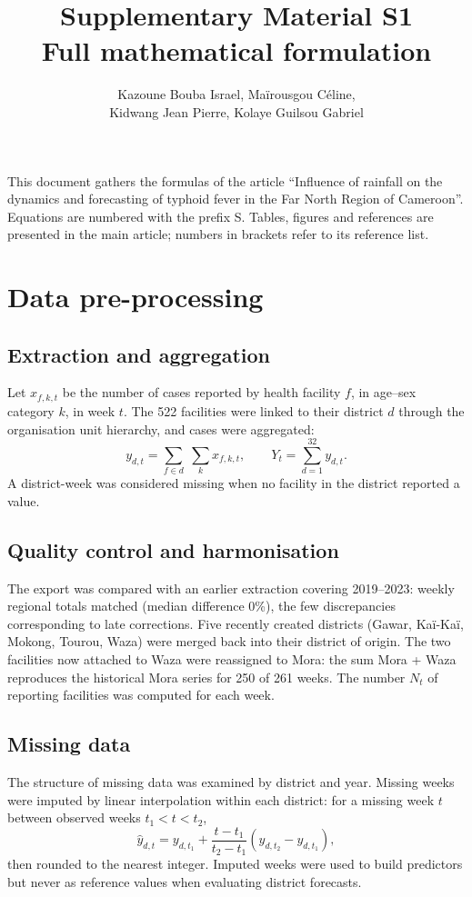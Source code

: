 \documentclass[11pt]{article}
\title{Supplementary Material S1\\[0.6ex] \large Full mathematical formulation}
\author{Kazoune Bouba Israel, Maïrousgou Céline,\\ Kidwang Jean Pierre, Kolaye Guilsou Gabriel}
\date{}
\begin{document}
\sloppy
\maketitle

\noindent This document gathers the formulas of the article “Influence of rainfall on the dynamics and forecasting of typhoid fever in the Far North Region of Cameroon”. Equations are numbered with the prefix S. Tables, figures and references are presented in the main article; numbers in brackets refer to its reference list.

\section{Data pre-processing}


\subsection{Extraction and aggregation}
Let $x_{f,k,t}$ be the number of cases reported by health facility $f$, in age–sex category $k$, in week $t$. The 522 facilities were linked to their district $d$ through the organisation unit hierarchy, and cases were aggregated:
\begin{equation}
y_{d,t}=\sum_{f\in d}\;\sum_{k} x_{f,k,t}, \qquad Y_t=\sum_{d=1}^{32} y_{d,t}.
\label{eq:agg}
\end{equation}
A district-week was considered missing when no facility in the district reported a value.

\subsection{Quality control and harmonisation}
The export was compared with an earlier extraction covering 2019–2023: weekly regional totals matched (median difference 0\%), the few discrepancies corresponding to late corrections. Five recently created districts (Gawar, Kaï-Kaï, Mokong, Tourou, Waza) were merged back into their district of origin. The two facilities now attached to Waza were reassigned to Mora: the sum Mora + Waza reproduces the historical Mora series for 250 of 261 weeks. The number $N_t$ of reporting facilities was computed for each week.

\subsection{Missing data}
The structure of missing data was examined by district and year. Missing weeks were imputed by linear interpolation within each district: for a missing week $t$ between observed weeks $t_1<t<t_2$,
\begin{equation}
\hat{y}_{d,t}=y_{d,t_1}+\frac{t-t_1}{t_2-t_1}\left(y_{d,t_2}-y_{d,t_1}\right),
\label{eq:interp}
\end{equation}
then rounded to the nearest integer. Imputed weeks were used to build predictors but never as reference values when evaluating district forecasts.
\end{document}
